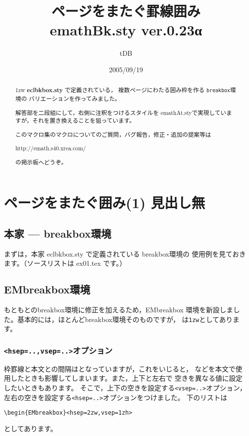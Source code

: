 \documentclass[a4j,fleqn]{jarticle}
\title{ページをまたぐ罫線囲み\\
emathBk.sty {\normalsize ver.0.23α}}
\author{tDB}
\date{2005/09/19}
\begin{document}
\maketitle\thispagestyle{empty}
\begin{abstract}%
\parindent1zw%
\textbf{eclbkbox.sty} で定義されている，
複数ページにわたる囲み枠を作る \texttt{breakbox}環境の
バリエーションを作ってみました。

解答部を二段組にして，右側に注釈をつけるスタイルを
\textsf{emathAt.sty}で実現していますが，それを置き換えることを狙っています。

このマクロ集のマクロについてのご質問，バグ報告，修正・追加の提案等は
\begin{center}
http://emath.s40.xrea.com/
\end{center}
の掲示板へどうぞ。
\end{abstract}
\pagebreak

%

\tableofcontents
\pagebreak
{}

\section{ページをまたぐ囲み(1) 見出し無}
\subsection{本家 --- \textsf{breakbox}環境}
まずは，本家 \textsf{eclbkbox.sty} で定義されている \textsf{breakbox}環境の
使用例を見ておきます。（ソースリストは ex01.tex です。）\bigskip



\subsection{\textsf{EMbreakbox}環境}
もともとの\textsf{breakbox}環境に修正を加えるため，\textsf{EMbreakbox}
環境を新設しました。基本的には，ほとんど\textsf{breakbox}環境そのものですが，
は\verb+1zw+としてあります。



\subsubsection{\texttt{<hsep=..,vsep=..>}オプション}
枠罫線と本文との間隔はとなっていますが，これをいじると，
などを本文で使用したときも影響してしまいます。また，上下と左右で
空きを異なる値に設定したいときもあります。
そこで，上下の空きを設定する\verb+<vsep=..>+オプション，
左右の空きを設定する\verb+<hsep=..>+オプションをつけました。
下のリストは
\begin{jquote}
\begin{verbatim}
\begin{EMbreakbox}<hsep=2zw,vsep=1zh>
\end{verbatim}
\end{jquote}
としてあります。
\bigskip
\end{document}
